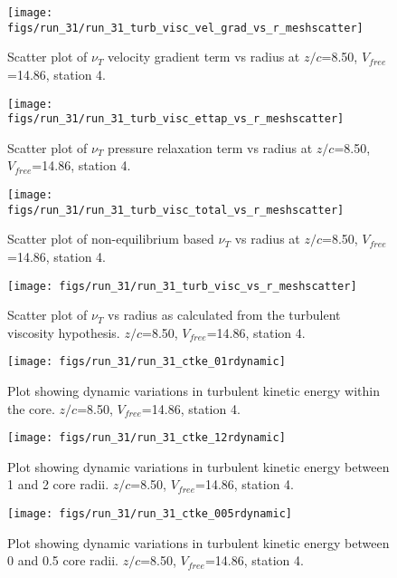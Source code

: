 \begin{figure}[H]
\centering
\texttt{[image: figs/run\_31/run\_31\_turb\_visc\_vel\_grad\_vs\_r\_meshscatter]}
\caption{Scatter plot of $\nu_T$ velocity gradient term vs radius at $z/c$=8.50, $V_{free}$=14.86, station 4.}
\end{figure}


\begin{figure}[H]
\centering
\texttt{[image: figs/run\_31/run\_31\_turb\_visc\_ettap\_vs\_r\_meshscatter]}
\caption{Scatter plot of $\nu_T$ pressure relaxation term vs radius at $z/c$=8.50, $V_{free}$=14.86, station 4.}
\end{figure}


\begin{figure}[H]
\centering
\texttt{[image: figs/run\_31/run\_31\_turb\_visc\_total\_vs\_r\_meshscatter]}
\caption{Scatter plot of non-equilibrium based $\nu_T$ vs radius at $z/c$=8.50, $V_{free}$=14.86, station 4.}
\end{figure}


\begin{figure}[H]
\centering
\texttt{[image: figs/run\_31/run\_31\_turb\_visc\_vs\_r\_meshscatter]}
\caption{Scatter plot of $\nu_T$ vs radius as calculated from the turbulent viscosity hypothesis. $z/c$=8.50, $V_{free}$=14.86, station 4.}
\end{figure}


\begin{figure}[H]
\centering
\texttt{[image: figs/run\_31/run\_31\_ctke\_01rdynamic]}
\caption{Plot showing dynamic variations in turbulent kinetic energy within the core. $z/c$=8.50, $V_{free}$=14.86, station 4.}
\end{figure}


\begin{figure}[H]
\centering
\texttt{[image: figs/run\_31/run\_31\_ctke\_12rdynamic]}
\caption{Plot showing dynamic variations in turbulent kinetic energy between 1 and 2 core radii. $z/c$=8.50, $V_{free}$=14.86, station 4.}
\end{figure}


\begin{figure}[H]
\centering
\texttt{[image: figs/run\_31/run\_31\_ctke\_005rdynamic]}
\caption{Plot showing dynamic variations in turbulent kinetic energy between 0 and 0.5 core radii. $z/c$=8.50, $V_{free}$=14.86, station 4.}
\end{figure}


